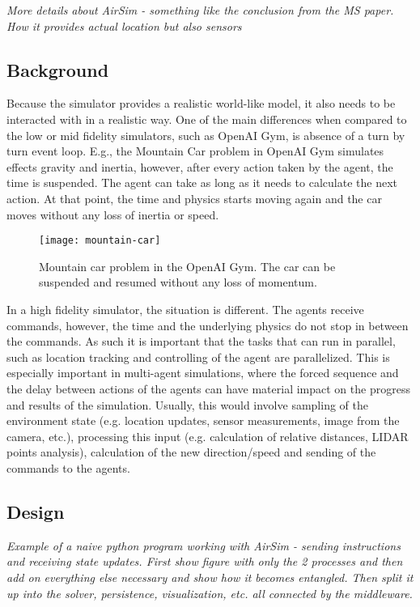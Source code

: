 \documentclass{article}
\begin{document}
\emph{More details about AirSim - something like the conclusion from the MS paper. How it provides actual location but also sensors}

\subsection{Background} 
Because the simulator provides a realistic world-like model, it also needs to be interacted with in a realistic way. One of the main differences when compared to the low or mid fidelity simulators, such as OpenAI Gym, is absence of a turn by turn event loop.
E.g., the Mountain Car problem in OpenAI Gym simulates effects gravity and inertia, however, after every action taken by the agent, the time is suspended. The agent can take as long as it needs to calculate the next action. At that point, the time and physics starts moving again and the car moves without any loss of inertia or speed.
\begin{figure}
	\centering
	\texttt{[image: mountain-car]}
	\caption{Mountain car problem in the OpenAI Gym. The car can be suspended and resumed without any loss of momentum.}\label{fig:mountain-car}
\end{figure}

In a high fidelity simulator, the situation is different. The agents receive commands, however, the time and the underlying physics do not stop in between the commands. As such it is important that the tasks that can run in parallel, such as location tracking and controlling of the agent are parallelized. This is especially important in multi-agent simulations, where the forced sequence and the delay between actions of the agents can have material impact on the progress and results of the simulation. Usually, this would involve sampling of the environment state (e.g. location updates, sensor measurements, image from the camera, etc.), processing this input (e.g. calculation of relative distances, LIDAR points analysis), calculation of the new direction/speed and sending of the commands to the agents.

\subsection{Design}

\emph{Example of a naive python program working with AirSim - sending instructions and receiving state updates. First show figure with only the 2 processes and then add on everything else necessary and show how it becomes entangled. Then split it up into the solver, persistence, visualization, etc. all connected by the middleware. }
\end{document}
